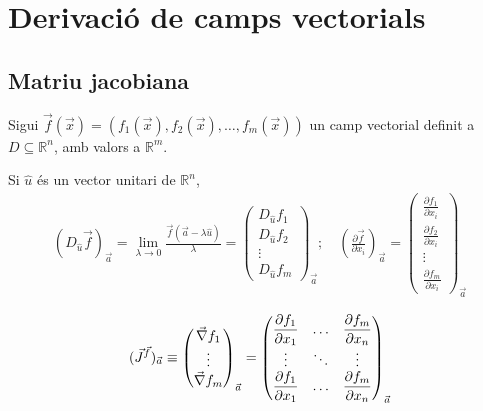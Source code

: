 \section{Derivació de camps vectorials}
\subsection{Matriu jacobiana}
Sigui $\vec{f}(\vec{x}) = (f_{1}(\vec{x}), f_{2}(\vec{x}), \dots, f_{m}(\vec{x}))$ un camp vectorial definit a $D \subseteq \mathbb{R}^{n}$, amb valors a $\mathbb{R}^{m}$.
\begin{defi}
    Si $\hat{u}$ és un vector unitari de $\mathbb{R}^{n}$,
    \begin{align}
        (D_{\hat{u}} \vec{f})_{\vec{a}} = \lim_{\lambda \to 0} \frac{\vec{f}(\vec{a} - \lambda \hat{u})}{\lambda} = \begin{pmatrix} D_{\hat{u}} f_{1} \\ D_{\hat{u}} f_{2} \\ \vdots \\ D_{\hat{u}} f_{m} \end{pmatrix}_{\vec{a}}; \quad \left( \frac{\partial \vec{f}}{\partial x_{i}} \right)_{\vec{a}} = \begin{pmatrix} \displaystyle \frac{\partial f_{1}}{\partial x_{i}} \\ \displaystyle \frac{\partial f_{2}}{\partial x_{i}} \\ \vdots \\ \displaystyle \frac{\partial f_{m}}{\partial x_{i}} \end{pmatrix}_{\vec{a}}
    \end{align}
\end{defi}
\begin{defi}
    \begin{align}
        (\vec{J}^{\vec{f}})_{\vec{a}} \equiv \begin{pmatrix} \vec{\nabla} f_{1} \\ \vdots \\ \vec{\nabla} f_{m} \end{pmatrix}_{\vec{a}} = \begin{pmatrix} \displaystyle \frac{\partial f_{1}}{\partial x_{1}} & \dots & \displaystyle \frac{\partial f_{m}}{\partial x_{n}} \\ \vdots & \ddots & \vdots \\ \displaystyle \frac{\partial f_{1}}{\partial x_{1}} & \dots & \displaystyle \frac{\partial f_{m}}{\partial x_{n}} \end{pmatrix}_{\vec{a}}
    \end{align}
\end{defi}


